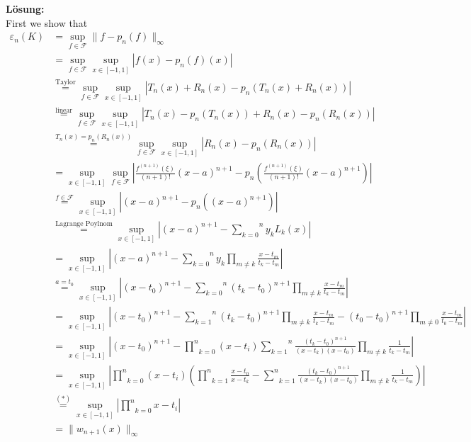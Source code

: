 \documentclass[11pt,a4paper,ngerman]{article}
\begin{document}
\textbf{Lösung:}\\
First we show that
\begin{equation*}\begin{split}
    \varepsilon_n(K)
    &= \underset{f \in \mathcal{F}}{\sup} \| f - p_n(f) \|_\infty\\
    &= \underset{f \in \mathcal{F}}{\sup}
        \underset{x \in [-1,1]}{\sup} | f (x) - p_n(f)(x) |\\
    &\stackrel{\text{Taylor}}{=} \underset{f \in \mathcal{F}}{\sup}
        \underset{x \in [-1,1]}{\sup} | T_n(x) + R_n(x) - p_n(T_n(x) + R_n(x)) |\\
    &\stackrel{\text{linear}}{=}\underset{f \in \mathcal{F}}{\sup} \underset{x \in [-1,1]}{\sup} | T_n(x) - p_n(T_n(x)) + R_n(x) - p_n(R_n(x)) |\\
    &\stackrel{T_n(x)=p_n(R_n(x))}{=} \underset{f \in \mathcal{F}}{\sup}\underset{x \in [-1,1]}{\sup} | R_n(x) - p_n(R_n(x)) | \\
    &= \underset{x \in [-1,1]}{\sup} \underset{f \in \mathcal{F}}{\sup}| \frac{f^{(n+1)}(\xi)}{(n+1)!} (x-a)^{n+1} - p_n(\frac{f^{(n+1)}(\xi)}{(n+1)!} (x-a)^{n+1}) |\\
    &\stackrel{f \in \mathcal{F}}{=} \underset{x \in [-1,1]}{\sup} | (x-a)^{n+1} - p_n((x-a)^{n+1}) |\\
    &\stackrel{\text{Lagrange Poylnom}}{=}
        \underset{x \in [-1,1]}{\sup}
    \left| (x-a)^{n+1} - \overset{n}{\underset{k=0}{\sum}} y_k L_k(x) \right|\\     
    &= \underset{x \in [-1,1]}{\sup}
     \left| (x-a)^{n+1} - 
    \overset{n}{\underset{k=0}{\sum}} y_k \underset{m \not= k}{\prod}
    \frac{x - t_m}{t_k - t_m} \right|\\
    &\stackrel{a = t_0}{=} \underset{x \in [-1,1]}{\sup}
        \left| (x-t_0)^{n+1} - \overset{n}{\underset{k=0}{\sum}} (t_k-t_0)^{n+1}
        \underset{m \not= k}{\prod} \frac{x - t_m}{t_k - t_m} \right| \\
    &= \underset{x \in [-1,1]}{\sup}
        \left| (x-t_0)^{n+1}-\overset{n}{\underset{k=1}{\sum}} (t_k - t_0)^{n+1}
        \underset{m \not= k}{\prod} \frac{x-t_m}{t_k - t_m} - (t_0-t_0)^{n+1}
        \underset{m \not= 0}{\prod} \frac{x - t_m}{t_0 - t_m} \right| \\
    &= \underset{x \in [-1,1]}{\sup}
        \left|  (x-t_0)^{n+1} - \underset{k=0}{\overset{n}{\prod}}(x-t_i)
        \overset{n}{\underset{k=1}{\sum}} 
        \frac{(t_k-t_0)^{n+1}}{(x-t_k)(x-t_0)}
        \underset{m \not= k}{\prod} \frac{1}{t_k - t_m}\right|\\
    &= \underset{x \in [-1,1]}{\sup}
        \left| \underset{k=0}{\overset{n}{\prod}} (x-t_i)
        \left( \underset{k=1}{\overset{n}{\prod}} \frac{x-t_0}{x-t_k}
        - \underset{k=1}{\overset{n}{\sum}}
        \frac{(t_k - t_0)^{n+1}}{(x-t_k)(x-t_0)}
        \underset{m\not= k}{\prod} \frac{1}{t_k - t_m} \right)\right|\\
    &\stackrel{(*)}{=} \underset{x \in [-1,1]}{\sup} \left| \underset{k=0}{
            \overset{n}{\prod}} x-t_i \right|\\
    &= \| w_{n+1}(x) \|_\infty
\end{split}\end{equation*}
\end{document}
